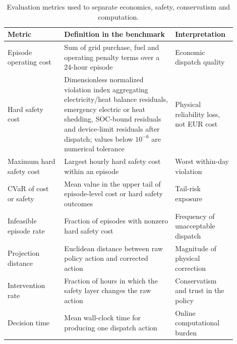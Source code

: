 \begin{table}[t]
\centering
\caption{Evaluation metrics used to separate economics, safety, conservatism and computation.}
\label{tab:metric_definitions}
\small
\setlength{\tabcolsep}{4pt}
\begin{tabular}{p{0.23\linewidth}p{0.45\linewidth}p{0.22\linewidth}}
\toprule
Metric & Definition in the benchmark & Interpretation \\
\midrule
Episode operating cost & Sum of grid purchase, fuel and operating penalty terms over a 24-hour episode & Economic dispatch quality \\
Hard safety cost & Dimensionless normalized violation index aggregating electricity/heat balance residuals, emergency electric or heat shedding, SOC-bound residuals and device-limit residuals after dispatch; values below $10^{-6}$ are numerical tolerance & Physical reliability loss, not EUR cost \\
Maximum hard safety cost & Largest hourly hard safety cost within an episode & Worst within-day violation \\
CVaR of cost or safety & Mean value in the upper tail of episode-level cost or hard safety outcomes & Tail-risk exposure \\
Infeasible episode rate & Fraction of episodes with nonzero hard safety cost & Frequency of unacceptable dispatch \\
Projection distance & Euclidean distance between raw policy action and corrected action & Magnitude of physical correction \\
Intervention rate & Fraction of hours in which the safety layer changes the raw action & Conservatism and trust in the policy \\
Decision time & Mean wall-clock time for producing one dispatch action & Online computational burden \\
\bottomrule
\end{tabular}
\end{table}
